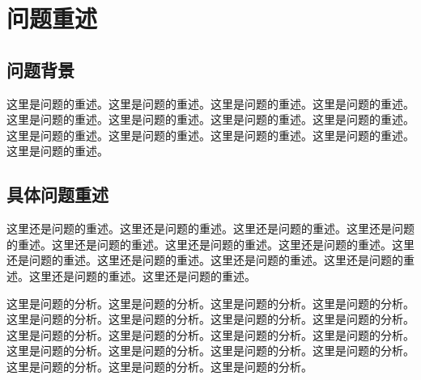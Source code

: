 \setcounter{page}{1}

%
%

\section{问题重述}

\subsection{问题背景}

这里是问题的重述。这里是问题的重述。这里是问题的重述。这里是问题的重述。这里是问题的重述。这里是问题的重述。这里是问题的重述。这里是问题的重述。这里是问题的重述。这里是问题的重述。这里是问题的重述。这里是问题的重述。这里是问题的重述。

\subsection{具体问题重述}

这里还是问题的重述。这里还是问题的重述。这里还是问题的重述。这里还是问题的重述。这里还是问题的重述。这里还是问题的重述。这里还是问题的重述。这里还是问题的重述。这里还是问题的重述。这里还是问题的重述。这里还是问题的重述。这里还是问题的重述。这里还是问题的重述。

%
%

这里是问题的分析。这里是问题的分析。这里是问题的分析。这里是问题的分析。这里是问题的分析。这里是问题的分析。这里是问题的分析。这里是问题的分析。这里是问题的分析。这里是问题的分析。这里是问题的分析。这里是问题的分析。这里是问题的分析。这里是问题的分析。这里是问题的分析。这里是问题的分析。这里是问题的分析。这里是问题的分析。这里是问题的分析。
